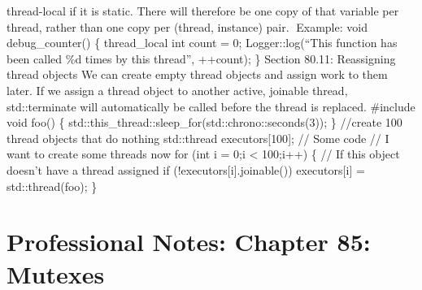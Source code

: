 thread-local if it is static. There will therefore be one copy of that
variable per thread, rather than one copy per (thread, instance) pair.
Example: void debug\_counter() \{ thread\_local int count = 0;
Logger::log(``This function has been called \%d times by this thread'',
++count); \} Section 80.11: Reassigning thread objects We can create
empty thread objects and assign work to them later. If we assign a
thread object to another active, joinable thread, std::terminate will
automatically be called before the thread is replaced. \#include void
foo() \{ std::this\_thread::sleep\_for(std::chrono::seconds(3)); \}
//create 100 thread objects that do nothing std::thread
executors{[}100{]}; // Some code // I want to create some threads now
for (int i = 0;i \textless{} 100;i++) \{ // If this object doesn't have
a thread assigned if (!executors{[}i{]}.joinable()) executors{[}i{]} =
std::thread(foo); \}

\hypertarget{professional-notes-chapter-85-mutexes-1}{%
\chapter{Professional Notes: Chapter 85:
Mutexes}\label{professional-notes-chapter-85-mutexes-1}}

